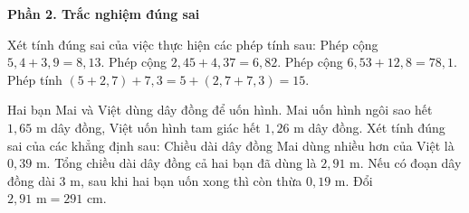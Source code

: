 \textbf{Phần 2. Trắc nghiệm đúng sai}

\begin{ex} %
Xét tính đúng sai của việc thực hiện các phép tính sau:
\choiceTF
{Phép cộng $5{,}4 + 3{,}9 = 8{,}13$.}
{\True Phép cộng $2{,}45 + 4{,}37 = 6{,}82$.}
{Phép cộng $6{,}53 + 12{,}8 = 78{,}1$.}
{\True Phép tính $(5 + 2{,}7) + 7{,}3 = 5 + (2{,}7 + 7{,}3) = 15$.}
\end{ex}

\begin{ex} %
Hai bạn Mai và Việt dùng dây đồng để uốn hình. Mai uốn hình ngôi sao hết $1{,}65\text{ m}$ dây đồng, Việt uốn hình tam giác hết $1{,}26\text{ m}$ dây đồng. Xét tính đúng sai của các khẳng định sau:
\choiceTF
{\True Chiều dài dây đồng Mai dùng nhiều hơn của Việt là $0{,}39\text{ m}$.}
{\True Tổng chiều dài dây đồng cả hai bạn đã dùng là $2{,}91\text{ m}$.}
{Nếu có đoạn dây đồng dài $3\text{ m}$, sau khi hai bạn uốn xong thì còn thừa $0{,}19\text{ m}$.}
{\True Đổi $2{,}91\text{ m} = 291\text{ cm}$.}
\end{ex}


